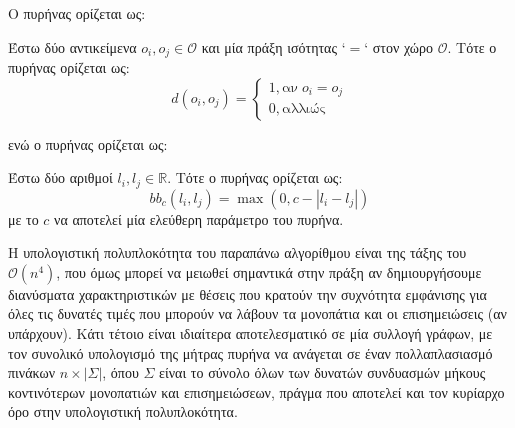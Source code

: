Ο πυρήνας  ορίζεται ως:
\begin{definition}
	Έστω δύο αντικείμενα $o_{i}, ο_{j} \in \mathcal{O}$ και μία πράξη ισότητας `$=$` στον χώρο $\mathcal{O}$.
	Τότε ο πυρήνας  ορίζεται ως:
	$$
	d(o_{i}, o_{j}) =  \begin{cases}
	1, \text{αν} \;o_{i} = o_{j}\\
	0, \text{αλλιώς}
	\end{cases}
	$$
	\label{def:dirac}
\end{definition}
ενώ ο πυρήνας  ορίζεται ως:
\begin{definition}
	Έστω δύο αριθμοί $l_{i}, l_{j} \in \mathbb{R}$.
	Τότε ο πυρήνας  ορίζεται ως:
    $$bb_{c}(l_{i}, l_{j}) = \max(0, c - |l_{i} - l_{j}|)$$
    με το $c$ να αποτελεί μία ελεύθερη παράμετρο του πυρήνα.
\end{definition}
Η υπολογιστική πολυπλοκότητα του παραπάνω αλγορίθμου είναι της τάξης του $\mathcal{O}(n^4)$, που όμως μπορεί να μειωθεί σημαντικά στην πράξη αν δημιουργήσουμε διανύσματα χαρακτηριστικών με θέσεις που κρατούν την συχνότητα εμφάνισης για όλες τις δυνατές τιμές που μπορούν να λάβουν τα μονοπάτια και οι επισημειώσεις (αν υπάρχουν).
Κάτι τέτοιο είναι ιδιαίτερα αποτελεσματικό σε μία συλλογή γράφων, με τον συνολικό υπολογισμό της μήτρας πυρήνα να ανάγεται σε έναν πολλαπλασιασμό πινάκων $n \times |\Sigma|$, όπου $\Sigma$ είναι το σύνολο όλων των δυνατών συνδυασμών μήκους κοντινότερων μονοπατιών και επισημειώσεων, πράγμα που αποτελεί και τον κυρίαρχο όρο στην υπολογιστική πολυπλοκότητα.

